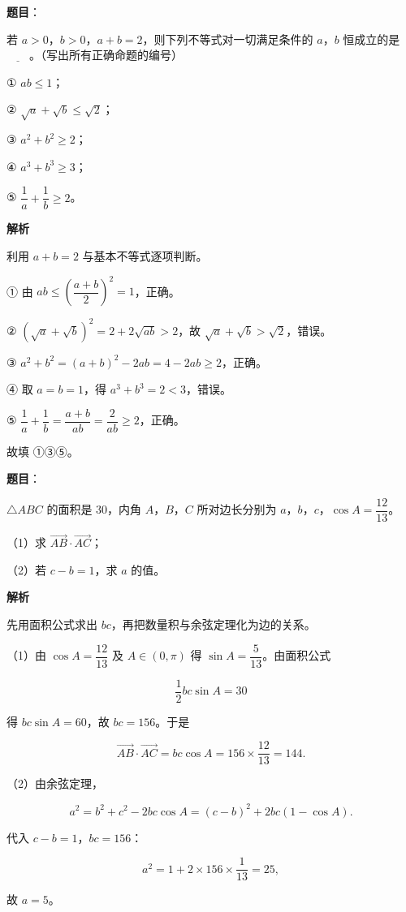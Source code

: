 \begin{answer}

\textbf{题目}：

若 $a>0$，$b>0$，$a+b=2$，则下列不等式对一切满足条件的 $a$，$b$ 恒成立的是$\underline{\qquad}$。（写出所有正确命题的编号）

① $ab\leqslant1$；

② $\sqrt a+\sqrt b\leqslant\sqrt2$；

③ $a^2+b^2\geqslant2$；

④ $a^3+b^3\geqslant3$；

⑤ $\dfrac1a+\dfrac1b\geqslant2$。

\textbf{解析}

利用 $a+b=2$ 与基本不等式逐项判断。

① 由 $ab\leqslant\left(\dfrac{a+b}2\right)^2=1$，正确。

② $(\sqrt a+\sqrt b)^2=2+2\sqrt{ab}>2$，故 $\sqrt a+\sqrt b>\sqrt2$，错误。

③ $a^2+b^2=(a+b)^2-2ab=4-2ab\geqslant2$，正确。

④ 取 $a=b=1$，得 $a^3+b^3=2<3$，错误。

⑤ $\dfrac1a+\dfrac1b=\dfrac{a+b}{ab}=\dfrac2{ab}\geqslant2$，正确。

故填 ①③⑤。


\end{answer}
\begin{answer}

\textbf{题目}：

$\triangle ABC$ 的面积是 $30$，内角 $A$，$B$，$C$ 所对边长分别为 $a$，$b$，$c$，$\cos A=\dfrac{12}{13}$。

（1）求 $\overrightarrow{AB}\cdot\overrightarrow{AC}$；

（2）若 $c-b=1$，求 $a$ 的值。

\textbf{解析}

先用面积公式求出 $bc$，再把数量积与余弦定理化为边的关系。

（1）由 $\cos A=\dfrac{12}{13}$ 及 $A\in(0,\pi)$ 得 $\sin A=\dfrac5{13}$。由面积公式

\nopagebreak[4]
\[\frac12bc\sin A=30\]

得 $bc\sin A=60$，故 $bc=156$。于是

\nopagebreak[4]
\[\overrightarrow{AB}\cdot\overrightarrow{AC}=bc\cos A=156\times\frac{12}{13}=144.\]

（2）由余弦定理，

\nopagebreak[4]
\[a^2=b^2+c^2-2bc\cos A=(c-b)^2+2bc(1-\cos A).\]

代入 $c-b=1$，$bc=156$：

\nopagebreak[4]
\[a^2=1+2\times156\times\frac1{13}=25,\]

故 $a=5$。


\end{answer}
